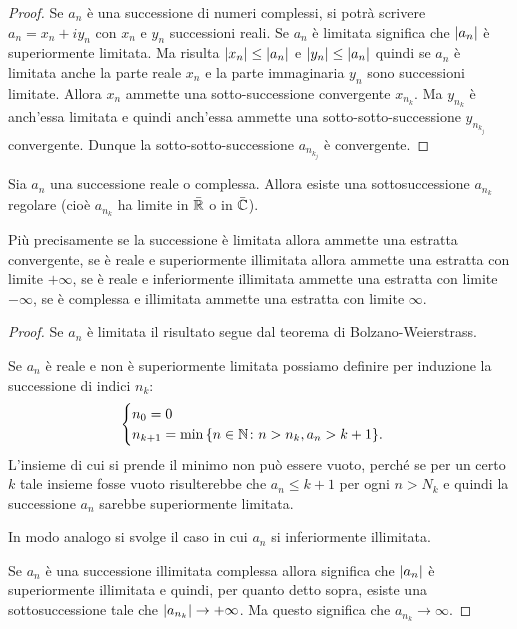 \begin{proof}
Se $a_n$ è una successione di numeri complessi, si potrà scrivere
$a_n = x_n + i y_n$ con
$x_n$ e $y_n$ successioni reali. Se $a_n$ è limitata significa che ${\left|a_n\right|}$
è superiormente limitata. Ma risulta ${\left|x_n\right|} \le {\left|a_n\right|}$ e
${\left|y_n\right|}\le {\left|a_n\right|}$ quindi se $a_n$ è limitata anche la parte reale
$x_n$ e la parte immaginaria $y_n$ sono successioni limitate.
Allora $x_n$ ammette una sotto-successione convergente $x_{n_k}$.
Ma $y_{n_k}$ è anch'essa limitata e quindi anch'essa ammette una
sotto-sotto-successione $y_{n_{k_j}}$ convergente.
Dunque la sotto-sotto-successione $a_{n_{k_j}}$ è convergente.
\end{proof}

\begin{corollary}\label{cor:Bolzano}
  Sia $a_n$ una successione reale o complessa.
  Allora esiste
  una sottosuccessione $a_{n_k}$ regolare (cioè $a_{n_k}$ ha limite in $\bar {\mathbb R}$ o in $\bar {\mathbb C}$).

  Più precisamente se la successione è limitata allora ammette una estratta convergente,
  se è reale e superiormente illimitata allora ammette
  una estratta con limite $+\infty$,
  se è reale e inferiormente illimitata ammette
  una estratta con limite $-\infty$,
  se è complessa e illimitata ammette
  una estratta con limite $\infty$.
\end{corollary}
%
\begin{proof}
  Se $a_n$ è limitata il risultato segue dal teorema di Bolzano-Weierstrass.

  Se $a_n$ è reale e non è superiormente limitata
  possiamo definire per induzione la successione di indici $n_k$:
  \[
  \begin{cases}
      n_0 = 0 \\
      n_{k+1} = \min{\left\{ n \in \mathbb N\colon n>n_k, a_n > k+1 \right\}}.
  \end{cases}
  \]
  L'insieme di cui si prende il minimo non può essere vuoto,
  perché se per un certo $k$ tale insieme fosse vuoto
  risulterebbe che $a_n\le k+1$ per ogni $n>N_k$ e quindi
  la successione $a_n$ sarebbe superiormente limitata.

  In modo analogo si svolge il caso in cui $a_n$ si inferiormente illimitata.

  Se $a_n$ è una successione illimitata complessa allora significa che
  ${\left|a_n\right|}$ è superiormente illimitata e quindi, per quanto detto sopra,
  esiste una sottosuccessione tale che ${\left|a_{n_k}\right|}\to +\infty$.
  Ma questo significa che $a_{n_k} \to \infty$.
\end{proof}

